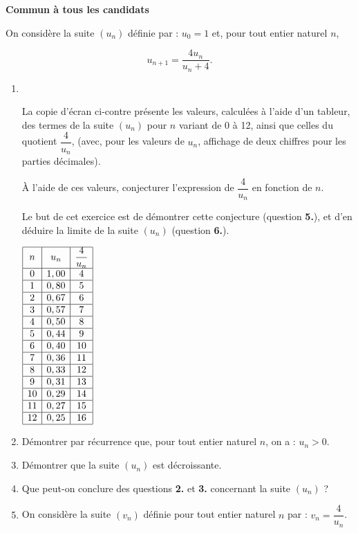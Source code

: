 
\textbf{Commun à tous les candidats}

\medskip

On considère la suite $\left(u_n\right)$ définie par : $u_0 = 1$ et, pour tout entier naturel $n$,

\[ u_{n+1}  = \dfrac{4u_n}{u_n + 4}.\]

\smallskip

\begin{enumerate}
\item ~

\parbox{0.7\linewidth}{
La copie d'écran ci-contre présente les valeurs, calculées à l'aide d'un tableur, des
termes de la suite $\left(u_n\right)$ pour $n$ variant de 0 à 12, ainsi que celles du quotient 
$\dfrac{4}{u_n}$,  (avec, pour les valeurs de $u_n$, affichage de deux
chiffres pour les parties décimales).

À l'aide de ces valeurs, conjecturer l'expression de $\dfrac{4}{u_n}$  en fonction de $n$.

Le but de cet exercice est de démontrer cette conjecture (question \textbf{5.}), et d'en déduire la limite de la suite $\left(u_n\right)$ (question \textbf{6.}).}\hfill
\parbox{0.25\linewidth}{
$\begin{array}{|*{3}{c|}}\hline
n&u_n&\dfrac{4}{u_n}\\ \hline
0 &1,00 &4\\ \hline
1 &0,80 &5\\ \hline
2 &0,67 &6\\ \hline
3 &0,57 &7\\ \hline
4 &0,50 &8\\ \hline
5 &0,44 &9\\ \hline
6 &0,40 &10\\ \hline
7 &0,36 &11\\ \hline
8 &0,33 &12\\ \hline
9 &0,31 &13\\ \hline
10 &0,29& 14 \\ \hline
11 &0,27& 15 \\ \hline
12 &0,25 &16\\ \hline
\end{array}$}

\item Démontrer par récurrence que, pour tout entier naturel $n$, on a : $u_n > 0$.
\item Démontrer que la suite $\left(u_n\right)$ est décroissante.
\item Que peut-on conclure des questions \textbf{2.} et \textbf{3.} concernant la suite $\left(u_n\right)$ ?
\item On considère la suite $\left(v_n\right)$ définie pour tout entier naturel $n$ par : $v_n = \dfrac{4}{u_n}$.


\end{enumerate}
